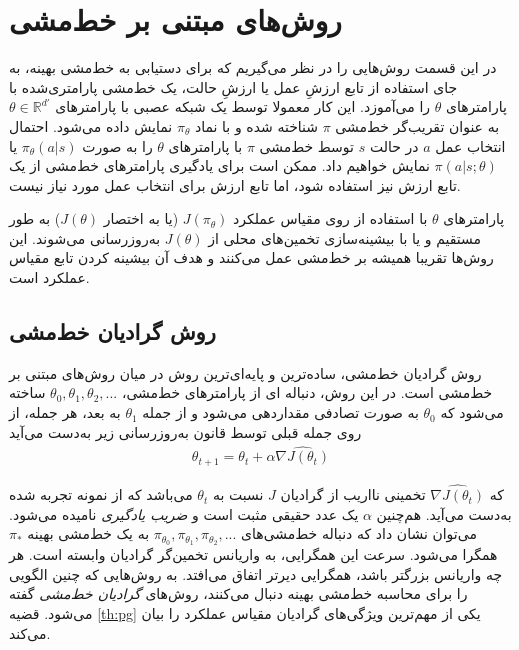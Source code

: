 \section{روش‌های مبتنی بر خط‌مشی}
در این قسمت روش‌هایی را در نظر می‌گیریم که برای دستیابی به خط‌مشی بهینه، به جای استفاده از تابع ارزشِ عمل یا ارزشِ حالت، یک خط‌مشی پارامتری‌شده 
با پارامترهای $\theta$ را می‌آموزد.  این کار  معمولا توسط یک شبکه عصبی با پارامترهای 
$\theta \in \mathbb{R}^{d'}$
 به عنوان تقریب‌گر خط‌مشی 
$\pi$
شناخته شده و با نماد $\pi_\theta$ نمایش داده می‌شود. احتمال انتخاب عمل $a$ در حالت $s$ توسط خط‌مشی $\pi$ با پارامترهای $\theta$ را به صورت
$\pi_\theta(a|s)$
یا
$\pi(a|s;\theta)$
نمایش خواهیم داد.
ممکن است برای یادگیری پارامترهای خط‌مشی از یک تابع ارزش نیز استفاده شود، اما تابع ارزش برای انتخاب عمل مورد نیاز نیست. 

پارامترهای $\theta$ با استفاده از  
روی مقیاس عملکرد  
$J(\pi_\theta)$
(یا به اختصار $J(\theta)$)
به طور مستقیم و یا با بیشینه‌سازی تخمین‌های محلی از  $J(\theta)$ به‌روزرسانی می‌شوند.
این روش‌ها تقریبا همیشه بر خط‌مشی  عمل می‌کنند و 
 هدف آن بیشینه کردن تابع مقیاس عملکرد است. 
 
 
\subsection{روش گرادیان خط‌مشی}
روش گرادیان خط‌مشی، ساده‌ترین و پایه‌ای‌ترین روش در میان روش‌های مبتنی بر خط‌مشی است. در این روش، دنباله‌
ای از پارامترهای خط‌مشی، 
$\theta_0, \theta_1, \theta_2, ...$
ساخته می‌شود که $\theta_0$ به صورت تصادفی مقداردهی می‌شود و از جمله 
$\theta_1$
به بعد، هر جمله، از روی جمله قبلی توسط قانون به‌روزرسانی زیر به‌دست می‌آید
\begin{align}
\theta_{t+1} = \theta_t + \alpha \widehat{\nabla J(\theta_t)}
\label{eq:updatepg}
\end{align}
 
که
$\widehat{\nabla J(\theta_t)}$
تخمینی نااریب از گرادیان  $J$ نسبت به 
$\theta_t$
 می‌باشد که از نمونه تجربه شده به‌دست می‌آید. هم‌چنین $\alpha$ یک عدد حقیقی مثبت است و 
 \textit{ضریب یادگیری}
 نامیده می‌شود. می‌توان نشان داد که دنباله خط‌مشی‌های
 $\pi_{\theta_0}, \pi_{\theta_1}, \pi_{\theta_2}, ...$
 به یک خط‌مشی بهینه $\pi_*$ همگرا می‌شود. سرعت این همگرایی، به واریانس تخمین‌گر گرادیان وابسته است. هر چه واریانس بزرگتر باشد، همگرایی دیرتر اتفاق می‌افتد. به روش‌هایی که چنین الگویی را برای محاسبه خط‌مشی بهینه دنبال می‌کنند، روش‌های 
\textit{گرادیان خط‌مشی}
 گفته می‌شود. قضیه
\ref{th:pg}
 	یکی از مهم‌ترین ویژگی‌های گرادیان مقیاس عملکرد را بیان می‌کند.

